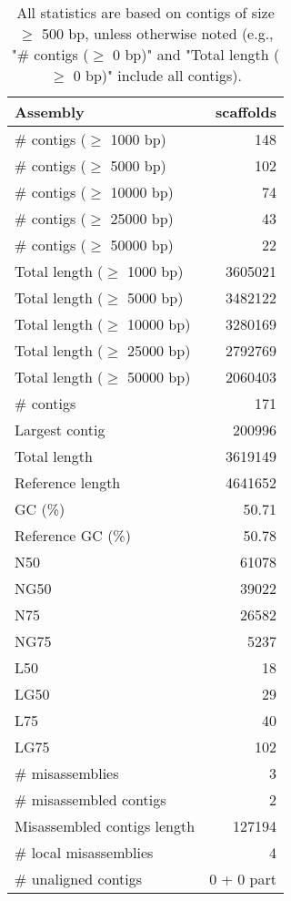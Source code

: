 \documentclass[12pt,a4paper]{article}
\begin{document}
\begin{table}[ht]
\begin{center}
\caption{All statistics are based on contigs of size $\geq$ 500 bp, unless otherwise noted (e.g., "\# contigs ($\geq$ 0 bp)" and "Total length ($\geq$ 0 bp)" include all contigs).}
\begin{tabular}{|l*{1}{|r}|}
\hline
Assembly & scaffolds \\ \hline
\# contigs ($\geq$ 1000 bp) & 148 \\ \hline
\# contigs ($\geq$ 5000 bp) & 102 \\ \hline
\# contigs ($\geq$ 10000 bp) & 74 \\ \hline
\# contigs ($\geq$ 25000 bp) & 43 \\ \hline
\# contigs ($\geq$ 50000 bp) & 22 \\ \hline
Total length ($\geq$ 1000 bp) & 3605021 \\ \hline
Total length ($\geq$ 5000 bp) & 3482122 \\ \hline
Total length ($\geq$ 10000 bp) & 3280169 \\ \hline
Total length ($\geq$ 25000 bp) & 2792769 \\ \hline
Total length ($\geq$ 50000 bp) & 2060403 \\ \hline
\# contigs & 171 \\ \hline
Largest contig & 200996 \\ \hline
Total length & 3619149 \\ \hline
Reference length & 4641652 \\ \hline
GC (\%) & 50.71 \\ \hline
Reference GC (\%) & 50.78 \\ \hline
N50 & 61078 \\ \hline
NG50 & 39022 \\ \hline
N75 & 26582 \\ \hline
NG75 & 5237 \\ \hline
L50 & 18 \\ \hline
LG50 & 29 \\ \hline
L75 & 40 \\ \hline
LG75 & 102 \\ \hline
\# misassemblies & 3 \\ \hline
\# misassembled contigs & 2 \\ \hline
Misassembled contigs length & 127194 \\ \hline
\# local misassemblies & 4 \\ \hline
\# unaligned contigs & 0 + 0 part \\ \hline

\end{tabular}
\end{center}
\end{table}
\end{document}
